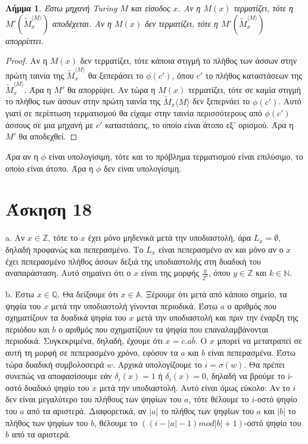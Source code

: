 \documentclass[a4paper, oneside, 11pt]{article}
\newtheorem{lm}[thm]{Λήμμα}
\theoremstyle{definition}
\begin{document}
\begin{lm}
Έστω μηχανή Turing $M$ και είσοδος $x$. Αν η $M(x)$ τερματίζει, τότε η $M'(\widetilde{M}_x^{\langle M\rangle})$
αποδέχεται. Αν η $M(x)$ δεν τερματίζει, τότε η $M'(\widetilde{M}_x^{\langle M\rangle})$ απορρίπτει.
\end{lm}
\begin{proof}
Αν η $M(x)$ δεν τερματίζει, τότε κάποια στιγμή το πλήθος των άσσων στην πρώτη ταινία της 
$\widetilde{M}_x^{\langle M\rangle}$
θα ξεπεράσει το $\phi(c')$, όπου $c'$ το πλήθος καταστάσεων της $\widetilde{M}_x^{\langle M\rangle}$. 
Άρα η $M'$ θα απορρίψει.
Αν τώρα η $M(x)$ τερματίζει, τότε σε καμία στιγμή το πλήθος των άσσων στην πρώτη ταινία της 
$\widetilde{M}_x{\langle M\rangle}$
δεν ξεπερνάει το $\phi(c')$. Αυτό γιατί σε περίπτωση τερματισμού θα είχαμε στην ταινία περισσότερους από $\phi(c')$
άσσους σε μια μηχανή με $c'$ καταστάσεις, το οποίο είναι άτοπο εξ' ορισμού. Άρα η $M'$ θα αποδεχθεί.
\end{proof}

Άρα αν η $\phi$ είναι υπολογίσιμη, τότε και το πρόβλημα τερματισμού είναι επιλύσιμο, το οποίο είναι άτοπο.
Άρα η $\phi$ δεν είναι υπολογίσιμη.

\section*{Άσκηση 18}

a. Αν $x\in \mathbb{Z}$, τότε το $x$ έχει μόνο μηδενικά μετά την υποδιαστολή, άρα $L_x=\emptyset$,
δηλαδή προφανώς και πεπερασμένο. Το $L_x$ είναι πεπερασμένο αν και μόνο αν ο $x$ έχει πεπερασμένο
πλήθος άσσων δεξιά της υποδιαστολής στη δυαδική του αναπαράσταση. Αυτό σημαίνει ότι ο $x$ είναι της
μορφής $\frac{y}{2^k}$, όπου $y\in \mathbb{Z}$ και $k\in \mathbb{N}$.

b. Έστω $x\in \mathbb{Q}$. Θα δείξουμε ότι $x\in \mathbb{A}$. Ξέρουμε ότι μετά από κάποιο σημείο,
τα ψηφία του $x$ μετά την υποδιαστολή γίνονται περιοδικά. Έστω $a$ ο αριθμός που σχηματίζουν τα
δυαδικά ψηφία του $x$ μετά την υποδιαστολή και πριν την έναρξη της περιόδου και $b$ ο αριθμός που
σχηματίζουν τα ψηφία που επαναλαμβάνονται περιοδικά. Συγκεκριμένα, δηλαδή, έχουμε ότι
$x=c.a\bar{b}$. Ο $x$ μπορεί να μετατραπεί σε αυτή τη μορφή σε πεπερασμένο χρόνο, εφόσον τα $a$ και
$b$ είναι πεπερασμένα. Έστω τώρα δυαδική συμβολοσειρά $w$. Αρχικά υπολογίζουμε το $i=\sigma(w)$. 
Θα πρέπει συνεπώς να αποφασίσουμε εάν $\delta_i (x)=1$ ή $\delta_i (x)=0$, δηλαδή να βρούμε το 
i-οστό δυαδικό ψηφίο του $x$ μετά την υποδιαστολή. Αυτό είναι όμως εύκολο: Αν το $i$ δεν είναι μεγαλύτερο
του πλήθους των ψηφίων του $a$, τότε θέλουμε το $i$-οστό ψηφίο του $a$ από τα αριστερά. Διαφορετικά,
αν $|a|$ το πλήθος των ψηφίων του $a$ και $|b|$ το πλήθος των ψηφίων του $b$, θέλουμε το 
$((i-|a|-1) mod |b| + 1)$-οστό ψηφίο του $b$ από τα αριστερά. 
\end{document}
